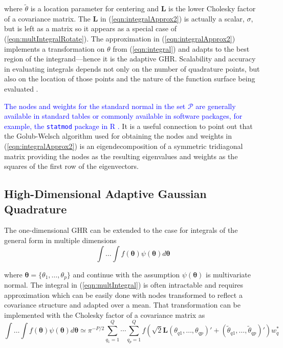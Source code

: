 \documentclass[12pt]{article}
\begin{document}
\noindent where $\widetilde{\theta}$ is a location parameter for centering \cite{liu:pierce,Naylor} and $\bm{L}$ is the lower Cholesky factor of a covariance matrix. The $\bm{L}$ in (\ref{eqn:integralApprox2}) is actually a scalar, $\sigma$, but is left as a matrix so it appears as a special case of (\ref{eqn:multIntegralRotate}). The approximation in (\ref{eqn:integralApprox2}) implements a transformation on $\theta$ from (\ref{eqn:integral}) and adapts to the best region of the integrand---hence it is the adaptive GHR. Scalability and accuracy in evaluating integrals depends not only on the number of quadrature points, but also on the location of those points and the nature of the function surface being evaluated \cite{Lesaffre}. 

\textcolor{blue}{The nodes and weights for the standard normal in the set $\mathcal{P}$ are generally available in standard tables \cite{mabramowitz64:handbook} or commonly available in software packages, for example, the \texttt{statmod} package in R \cite{RJ-2016-024}.} It is a useful connection to point out that the Golub-Welsch algorithm \cite{golub} used for obtaining the nodes and weights in (\ref{eqn:integralApprox2}) is an eigendecomposition of a symmetric tridiagonal matrix providing the nodes as the resulting eigenvalues and weights as the squares of the first row of the eigenvectors. 

\subsection*{High-Dimensional Adaptive Gaussian Quadrature}

The one-dimensional GHR can be extended to the case for integrals of the general form in multiple dimensions 
\begin{equation}
\label{eqn:multIntegral}
\int \ldots \int f(\bm{\theta}) \psi(\bm{\theta}) d\bm{\theta}
\end{equation}

\noindent where $\bm{\theta} = \{\theta_{1}, \ldots, \theta_{p}\}$ and continue with the assumption $\psi(\bm{\theta})$ is multivariate normal. The integral in (\ref{eqn:multIntegral}) is often intractable and requires approximation which can be easily done with nodes transformed to reflect a covariance structure and adapted over a mean. That transformation can be implemented with the Cholesky factor of a covariance matrix as \cite{chowdhary,jackel,judd,stringer} 
\begin{equation}
\label{eqn:multIntegralRotate}
\int \ldots \int f(\bm{\theta})\psi(\bm{\theta}) d\bm{\theta}  \simeq  \pi^{-P/2}\sum_{q_1=1}^{Q} \cdots \sum_{q_p=1}^{Q} f(\sqrt{2}\bm{L}(\theta_{q1}, \ldots, \theta_{qp})' + (\widetilde{\theta}_{q1}, \ldots, \widetilde{\theta}_{qp})')w_q^*
\end{equation}
 
\end{document}
